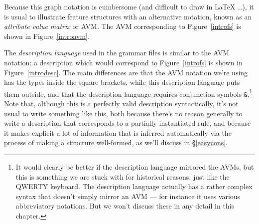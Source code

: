 \documentclass[12pt]{report}
\newcommand{\newterm}[1]{{\it #1}}
\begin{document}
Because this graph notation is cumbersome (and difficult to draw in
LaTeX \ldots),
it is usual to illustrate feature structures with an alternative notation,
known as an \newterm{attribute value matrix} or AVM.  The AVM
corresponding to Figure~\ref{introfs} is shown in Figure~\ref{introavm}.

The \newterm{description language} used in the grammar files is
similar to the AVM notation: a description which would correspond to
Figure~\ref{introfs} is shown in Figure~\ref{introdesc}.  
The main differences are that the AVM notation we're using
has the types inside the square brackets, while this description language
puts them outside, and that the description language requires
conjunction symbols \verb+&+.\footnote{It would clearly be better if the
description language mirrored the AVMs, but this is something 
we are stuck with for historical reasons, just like the QWERTY keyboard.
The description language actually has a rather complex syntax 
that doesn't simply mirror an AVM --- for instance it uses
various abbreviatory notations.  But we won't discuss these in any
detail in this chapter.}
Note that, although this is a perfectly valid description syntactically,
it's not usual to write something like this, both because
there's no reason generally to write a description that corresponds
to a partially instantiated rule, and because
it makes explicit a lot of 
information that is inferred automatically via the
process of making a structure well-formed, as we'll discuss in \S\ref{easycons}.
\end{document}
